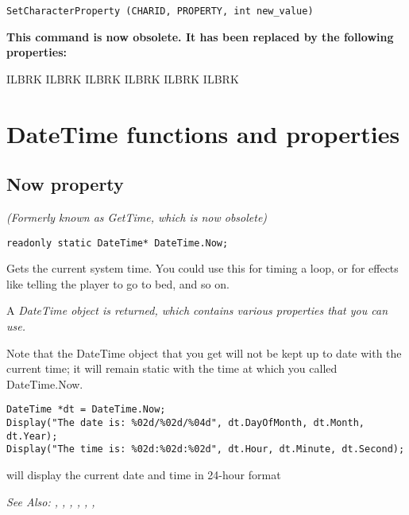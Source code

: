 \begin{verbatim}
SetCharacterProperty (CHARID, PROPERTY, int new_value)
\end{verbatim}

\bf{This command is now obsolete. It has been replaced by the following properties:}

 ILBRK
 ILBRK
 ILBRK
 ILBRK
 ILBRK
 ILBRK



\section{DateTime functions and properties}%


\subsection{Now property}\label{DateTime.Now}%

\it{(Formerly known as GetTime, which is now obsolete)}

\begin{verbatim}
readonly static DateTime* DateTime.Now;
\end{verbatim}
Gets the current system time.
You could use this for timing a loop, or for effects like telling the
player to go to bed, and so on.

A \it{DateTime} object is returned, which contains various properties that you can use.

Note that the DateTime object that you get will not be kept up to date with the current time;
it will remain static with the time at which you called DateTime.Now.

\begin{verbatim}
DateTime *dt = DateTime.Now;
Display("The date is: %02d/%02d/%04d", dt.DayOfMonth, dt.Month, dt.Year);
Display("The time is: %02d:%02d:%02d", dt.Hour, dt.Minute, dt.Second);
\end{verbatim}
will display the current date and time in 24-hour format

\it{See Also:} ,
,
,
,
,
,


